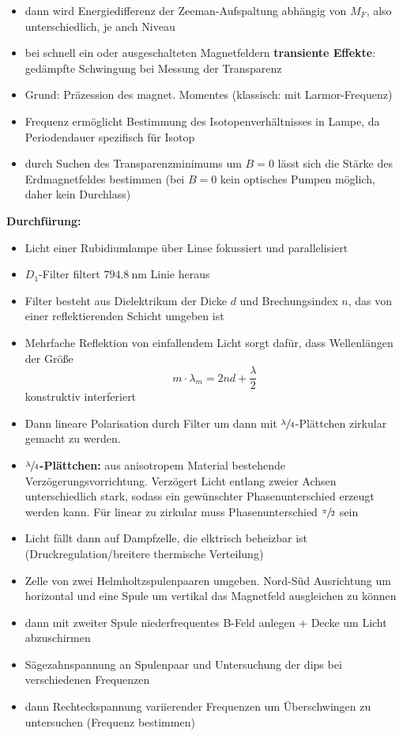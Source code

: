 \begin{itemize}
    \item dann wird Energiedifferenz der Zeeman-Aufspaltung abhängig von $M_F$, also unterschiedlich, je anch Niveau
    \item bei schnell ein oder ausgeschalteten Magnetfeldern \textbf{transiente Effekte}: gedämpfte Schwingung bei Messung der Transparenz
    \item Grund: Präzession des magnet. Momentes (klassisch: mit Larmor-Frequenz)
    \item Frequenz ermöglicht Bestimmung des Isotopenverhältnisses in Lampe, da Periodendauer spezifisch für Isotop
    \item durch Suchen des Transparenzminimums um $B=0$ lässt sich die Stärke des Erdmagnetfeldes bestimmen (bei $B=0$ kein optisches Pumpen möglich, daher kein Durchlass)
\end{itemize}

\textbf{Durchfürung:}
\begin{itemize}
    \item Licht einer Rubidiumlampe über Linse fokussiert und parallelisiert
    \item $D_1$-Filter filtert $\SI{794,8}{\nano\meter}$ Linie heraus
    \item Filter besteht aus Dielektrikum der Dicke $d$ und Brechungsindex $n$, das von einer reflektierenden Schicht umgeben ist
    \item Mehrfache Reflektion von einfallendem Licht sorgt dafür, dass Wellenlängen der Größe
        \begin{equation}
            m\cdot \lambda_m = 2nd+\frac{\lambda}{2}
        \end{equation}
        konstruktiv interferiert
    \item Dann lineare Polarisation durch Filter um dann mit $\sfrac{\lambda}{4}$-Plättchen zirkular gemacht zu werden.
    \item \textbf{$\sfrac{\lambda}{4}$-Plättchen:} aus anisotropem Material bestehende Verzögerungsvorrichtung. Verzögert Licht entlang zweier Achsen unterschiedlich stark, sodass ein gewünschter Phasenunterschied erzeugt werden kann. Für linear zu zirkular muss Phasenunterschied $\sfrac{\pi}{2}$ sein
    \item Licht fällt dann auf Dampfzelle, die elktrisch beheizbar ist (Druckregulation/breitere thermische Verteilung)
    \item Zelle von zwei Helmholtzspulenpaaren umgeben. Nord-Süd Ausrichtung um horizontal und eine Spule um vertikal das Magnetfeld ausgleichen zu können
    \item dann mit zweiter Spule niederfrequentes B-Feld anlegen + Decke um Licht abzuschirmen
    \item Sägezahnspannung an Spulenpaar und Untersuchung der dips bei verschiedenen Frequenzen
    \item dann Rechteckspannung variierender Frequenzen um Überschwingen zu untersuchen (Frequenz bestimmen)
\end{itemize}

